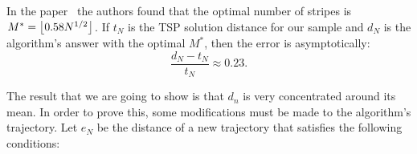 \begin{figure}[ht]\label{TSP:pic0}
    \centering
\end{figure}

In the paper~\cite{gzyl1990physicist} the authors found that the optimal  number of stripes is $M^* = \left\lfloor0.58 N^{1/2}\right\rfloor$. If $t_N$ is the TSP solution distance for our sample and $d_N$ is the algorithm's answer with the optimal $M^*$, then the error is asymptotically:
\[  \frac{d_N-t_N}{t_N} \approx 0.23.\] 

The result that we are going to show is that $d_n$ is very concentrated around its mean. In order to prove this, some modifications must be made to the algorithm's trajectory. Let $e_N$ be the distance of a new trajectory that satisfies the following conditions:

